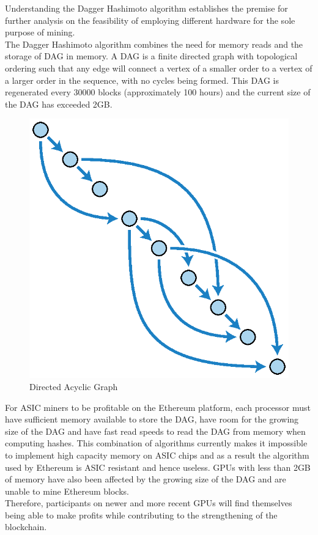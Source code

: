 \documentclass[a4paper,12pt]{article}
\begin{document}
{	Understanding the Dagger Hashimoto algorithm establishes the premise for further analysis on the feasibility of employing different hardware for the sole purpose of mining. \\\newline
	The Dagger Hashimoto algorithm combines the need for memory reads and the storage of \ac{DAG} in memory. A \ac{DAG} is a finite directed graph with topological ordering such that any edge will connect a vertex of a smaller order to a vertex of a larger order in the sequence, with no cycles being formed. This \ac{DAG} is regenerated every 30000 blocks (approximately 100 hours) and the current size of the \ac{DAG} has exceeded 2GB. 
	\begin{figure}[H]
		\centering
		\includegraphics[width=0.3\linewidth]{dag.eps}
		\caption[Directed Acyclic Graph]{Directed Acyclic Graph \cite{DAG}}
		\label{fig:dag}
	\end{figure}
	\noindent For \ac{ASIC} miners to be profitable on the Ethereum platform, each processor must have sufficient memory available to store the \ac{DAG}, have room for the growing size of the \ac{DAG} and have fast read speeds to read the \ac{DAG} from memory when computing hashes. This combination of algorithms currently makes it impossible to implement high capacity memory on \ac{ASIC} chips and as a result the algorithm used by Ethereum is \ac{ASIC} resistant and hence useless. \ac{GPU}s with less than 2GB of memory have also been affected by the growing size of the \ac{DAG} and are unable to mine Ethereum blocks.\\\newline
	Therefore, participants on newer and more recent \ac{GPU}s will find themselves being able to make profits while contributing to the strengthening of the blockchain.
}
\end{document}
